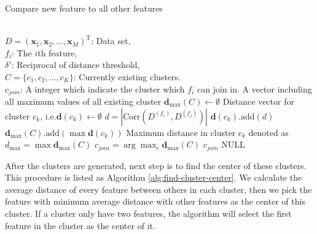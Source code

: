\documentclass{ieeeaccess}
\theoremstyle{definition}
\begin{document}
    \begin{algorithm}
    \caption{Compare new feature to all other features}
    \label{alg:compare-and-join}
    \begin{algorithmic}[1]
    \REQUIRE ~~\\
        $D=(\bm{x}_1,\bm{x}_2,\ldots,\bm{x}_M)^\text{T}$: Data set, \\
        $f_i$: The $i$th feature, \\
        $\delta'$: Reciprocal of distance threshold,\\
        $C=\{c_1, c_2, \ldots, c_K\}$: Currently existing clusters.
    \ENSURE ~~\\
        $c_{join}$: A integer which indicate the cluster which $f_i$ can join in.
    \STATE A vector including all maximum values of all existing cluster $\bm{d}_{\max}(C) \gets \emptyset$
        \STATE Distance vector for cluster $c_k$, i.e.$\bm{d}(c_k) \gets \emptyset$
            \STATE $d=|\text{Corr}(D^{(f_i)}, D^{(f_j)})|$
            \STATE $\bm{d}(c_k)\text{.add}(d)$
        \ENDFOR
        \STATE $\bm{d}_{\max}(C)\text{.add}(\max{\bm{d}(c_k)})$
    \ENDFOR
    \STATE Maximum distance in cluster $c_k$ denoted as $d_{\max}=\max{\bm{d}_{\max}(C)}$
        \STATE $c_{join}=\arg\max_c{\bm{d}_{\max}(C)}$
        \RETURN $c_{join}$
    \ELSE
        \RETURN NULL
    \ENDIF
    \end{algorithmic}
\end{algorithm}

After the clusters are generated, next step is to find the center of these clusters. This procedure is listed as Algorithm \ref{alg:find-cluster-center}. We calculate the average distance of every feature between others in each cluster, then we pick the feature with minimum average distance with other features as the center of this cluster. If a cluster only have two features, the algorithm will select the first feature in the cluster as the center of it.
\end{document}
